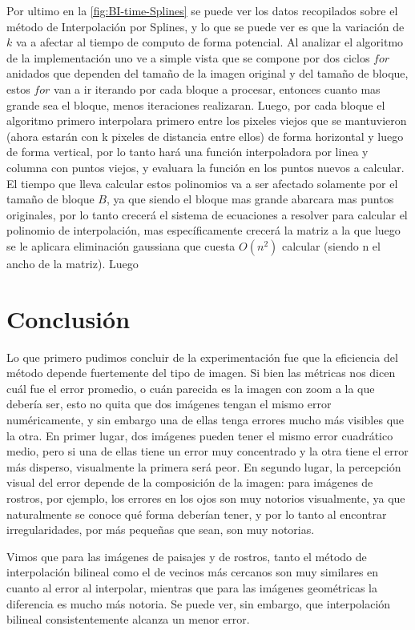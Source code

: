 \documentclass{article}
\begin{document}
Por ultimo en la \ref{fig:BI-time-Splines} se puede ver los datos recopilados sobre el método de Interpolación por Splines, y lo que se puede ver es que la variación de $k$ va a afectar al tiempo de computo de forma potencial. Al analizar el algoritmo de la implementación uno ve a simple vista que se compone por dos ciclos $for$ anidados que dependen del tamaño de la imagen original y del tamaño de bloque, estos $for$ van a ir iterando por cada bloque a procesar, entonces cuanto mas grande sea el bloque, menos iteraciones realizaran. Luego, por cada bloque el algoritmo primero interpolara primero entre los pixeles viejos que se mantuvieron (ahora estarán con k pixeles de distancia entre ellos) de forma horizontal y luego de forma vertical, por lo tanto hará una función interpoladora por linea y columna con puntos viejos, y evaluara la función en los puntos nuevos a calcular. El tiempo que lleva calcular estos polinomios va a ser afectado solamente por el tamaño de bloque $B$, ya que siendo el bloque mas grande abarcara mas puntos originales, por lo tanto crecerá el sistema de ecuaciones a resolver para calcular el polinomio de interpolación, mas específicamente crecerá la matriz a la que luego se le aplicara eliminación gaussiana que cuesta $O(n^2)$ calcular (siendo n el ancho de la matriz).
Luego 

\section{Conclusión}

Lo que primero pudimos concluir de la experimentación fue que la eficiencia del método depende fuertemente del tipo de imagen. Si bien las métricas nos dicen cuál fue el error promedio, o cuán parecida es la imagen con zoom a la que debería ser, esto no quita que dos imágenes tengan el mismo error numéricamente, y sin embargo una de ellas tenga errores mucho más visibles que la otra. En primer lugar, dos imágenes pueden tener el mismo error cuadrático medio, pero si una de ellas tiene un error muy concentrado y la otra tiene el error más disperso, visualmente la primera será peor. En segundo lugar, la percepción visual del error depende de la composición de la imagen: para imágenes de rostros, por ejemplo, los errores en los ojos son muy notorios visualmente, ya que naturalmente se conoce qué forma deberían tener, y por lo tanto al encontrar irregularidades, por más pequeñas que sean, son muy notorias.

Vimos que para las imágenes de paisajes y de rostros, tanto el método de interpolación bilineal como el de vecinos más cercanos son muy similares en cuanto al error al interpolar, mientras que para las imágenes geométricas la diferencia es mucho más notoria. Se puede ver, sin embargo, que interpolación bilineal consistentemente alcanza un menor error.
\end{document}
